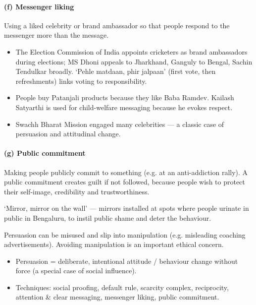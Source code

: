 \paragraph{(f) Messenger liking} Using a liked celebrity or brand ambassador so that people respond to the messenger more than the message.

\begin{GovtPolicy}
\begin{itemize}
\item The Election Commission of India appoints cricketers as brand ambassadors during elections; MS Dhoni appeals to Jharkhand, Ganguly to Bengal, Sachin Tendulkar broadly. `Pehle matdaan, phir jalpaan' (first vote, then refreshments) links voting to responsibility.
\item People buy Patanjali products because they like Baba Ramdev. Kailash Satyarthi is used for child-welfare messaging because he evokes respect.
\item Swachh Bharat Mission engaged many celebrities --- a classic case of persuasion and attitudinal change.
\end{itemize}
\end{GovtPolicy}

\paragraph{(g) Public commitment} Making people publicly commit to something (e.g. at an anti-addiction rally). A public commitment creates guilt if not followed, because people wish to protect their self-image, credibility and trustworthiness.

\begin{ExampleBox}
`Mirror, mirror on the wall' --- mirrors installed at spots where people urinate in public in Bengaluru, to instil public shame and deter the behaviour.
\end{ExampleBox}

\begin{CriticalPoint}
Persuasion can be misused and slip into manipulation (e.g. misleading coaching advertisements). Avoiding manipulation is an important ethical concern.
\end{CriticalPoint}

\begin{QuickRevision}
\begin{itemize}
\item Persuasion = deliberate, intentional attitude / behaviour change without force (a special case of social influence).
\item Techniques: social proofing, default rule, scarcity complex, reciprocity, attention \& clear messaging, messenger liking, public commitment.
\end{itemize}
\end{QuickRevision}

